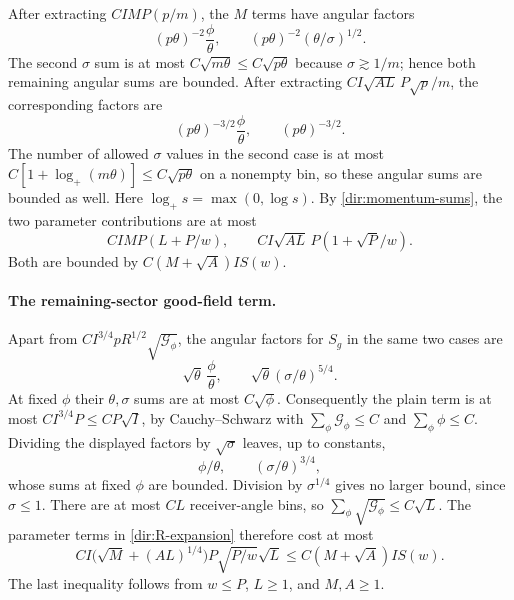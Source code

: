After extracting $CIM P(p/m)$, the $M$ terms have angular factors
\[
 (p\theta)^{-2}\frac\phi\theta,
 \qquad (p\theta)^{-2}(\theta/\sigma)^{1/2}.
\]
The second $\sigma$ sum is at most $C\sqrt{m\theta}\le
C\sqrt{p\theta}$ because $\sigma\gtrsim1/m$; hence both remaining
angular sums are bounded.  After extracting
$CI\sqrt{AL}\,P\sqrt p/m$, the corresponding factors are
\[
 (p\theta)^{-3/2}\frac\phi\theta,
 \qquad (p\theta)^{-3/2}.
\]
The number of allowed $\sigma$ values in the second case is at most
$C[1+\log_+(m\theta)]\le C\sqrt{p\theta}$ on a nonempty bin, so
these angular sums are bounded as well.  Here
$\log_+s=\max(0,\log s)$.  By
\eqref{dir:momentum-sums}, the two parameter contributions are at
most
\[
 CI M P(L+P/w),\qquad
 CI\sqrt{AL}\,P(1+\sqrt P/w).
\]
Both are bounded by $C(M+\sqrt A)I S(w)$.

\paragraph{The remaining-sector good-field term.}
Apart from $CI^{3/4}pR^{1/2}\sqrt{\mathcal G_\phi}$,
the angular factors for $S_g$ in the same two cases are
\[
 \sqrt\theta\,\frac\phi\theta,
 \qquad \sqrt\theta(\sigma/\theta)^{5/4}.
\]
At fixed $\phi$ their $\theta,\sigma$ sums are at most
$C\sqrt\phi$.  Consequently the plain term is at most
$CI^{3/4}P\le CP\sqrt I$, by Cauchy--Schwarz with
$\sum_\phi\mathcal G_\phi\le C$ and $\sum_\phi\phi\le C$.
Dividing the displayed factors by $\sqrt\sigma$ leaves, up to
constants,
\[
 \phi/\theta,
 \qquad (\sigma/\theta)^{3/4},
\]
whose sums at fixed $\phi$ are bounded.  Division by
$\sigma^{1/4}$ gives no larger bound, since $\sigma\le1$.
There are at most $CL$ receiver-angle bins, so
$\sum_\phi\sqrt{\mathcal G_\phi}\le C\sqrt L$.
The parameter terms in \eqref{dir:R-expansion} therefore cost at most
\begin{equation}\label{dir:field-parameters}
 CI\bigl(\sqrt M+(AL)^{1/4}\bigr)
       P\sqrt{P/w}\sqrt L
 \le C(M+\sqrt A)I S(w).
\end{equation}
The last inequality follows from $w\le P$, $L\ge1$, and $M,A\ge1$.

